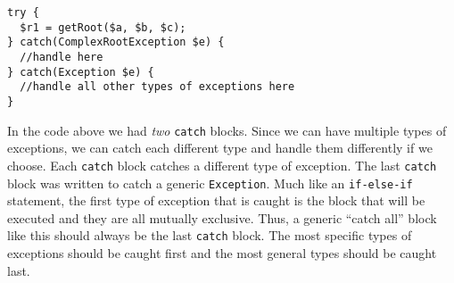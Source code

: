 \begin{verbatim}
try {
  $r1 = getRoot($a, $b, $c);
} catch(ComplexRootException $e) {
  //handle here
} catch(Exception $e) {
  //handle all other types of exceptions here
}
\end{verbatim}

In the code above we had \emph{two} \texttt{catch}
blocks.  Since we can have multiple types of exceptions, we
can catch each different type and handle them differently
if we choose. Each \texttt{catch} block catches a different 
type of exception.  The last \texttt{catch} block 
was written to catch a generic \texttt{Exception}.   
Much like an \texttt{if-else-if} statement, the
first type of exception that is caught is the block that will
be executed and they are all mutually exclusive.  Thus, a generic
``catch all'' block like this should always be the last 
\texttt{catch} block.  The most specific types
of exceptions should be caught first and the most general
types should be caught last.


